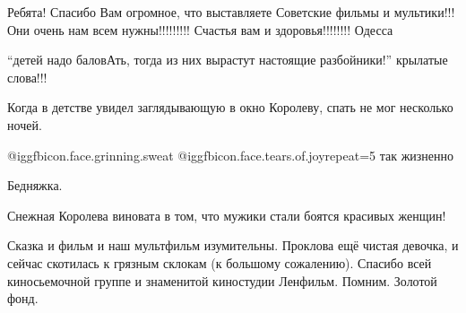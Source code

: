 \begin{itemize}
\begin{multicols}{2}

Ребята! Спасибо Вам огромное, что выставляете Советские фильмы и мультики!!!
Они очень нам всем нужны!!!!!!!!! Счастья вам и здоровья!!!!!!!! Одесса


\enquote{детей надо баловАть, тогда из них вырастут  настоящие разбойники!}  крылатые
слова!!!

Когда  в детстве увидел заглядывающую в окно Королеву, спать не мог несколько ночей.

\begin{itemize} %
 @igg{fbicon.face.grinning.sweat}  @igg{fbicon.face.tears.of.joy}{repeat=5} так жизненно

Бедняжка.

Снежная Королева виновата в том, что мужики стали боятся красивых женщин!
\end{itemize} %


Сказка и фильм и наш мультфильм изумительны. Проклова ещё чистая девочка, и
сейчас скотилась к грязным склокам (к большому сожалению). Спасибо всей
киносьемочной группе и знаменитой киностудии Ленфильм. Помним. Золотой фонд.

\end{multicols}

\end{itemize} %
